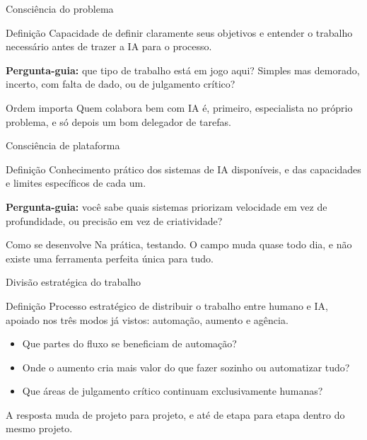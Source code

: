 \documentclass[aspectratio=169,11pt]{beamer}
\begin{document}
\begin{frame}{Consciência do problema}
  \begin{notebox}{Definição}
    \small Capacidade de definir claramente seus objetivos e entender o trabalho necessário antes de trazer a IA para o processo.
  \end{notebox}
  \vspace{0.25cm}
  \textbf{Pergunta-guia:} que tipo de trabalho está em jogo aqui? Simples mas demorado, incerto, com falta de dado, ou de julgamento crítico?

  \begin{alertbox}{Ordem importa}
    \small Quem colabora bem com IA é, primeiro, especialista no próprio problema, e só depois um bom delegador de tarefas.
  \end{alertbox}
\end{frame}

\begin{frame}{Consciência de plataforma}
  \begin{notebox}{Definição}
    \small Conhecimento prático dos sistemas de IA disponíveis, e das capacidades e limites específicos de cada um.
  \end{notebox}
  \vspace{0.25cm}
  \textbf{Pergunta-guia:} você sabe quais sistemas priorizam velocidade em vez de profundidade, ou precisão em vez de criatividade?

  \begin{alertbox}{Como se desenvolve}
    \small Na prática, testando. O campo muda quase todo dia, e não existe uma ferramenta perfeita única para tudo.
  \end{alertbox}
\end{frame}

\begin{frame}{Divisão estratégica do trabalho}
  \begin{notebox}{Definição}
    \small Processo estratégico de distribuir o trabalho entre humano e IA, apoiado nos três modos já vistos: automação, aumento e agência.
  \end{notebox}
  \vspace{0.25cm}
  \begin{itemize}
    \item Que partes do fluxo se beneficiam de automação?
    \item Onde o aumento cria mais valor do que fazer sozinho ou automatizar tudo?
    \item Que áreas de julgamento crítico continuam exclusivamente humanas?
  \end{itemize}

  \begin{alertbox}{}
    \small A resposta muda de projeto para projeto, e até de etapa para etapa dentro do mesmo projeto.
  \end{alertbox}
\end{frame}
\end{document}
